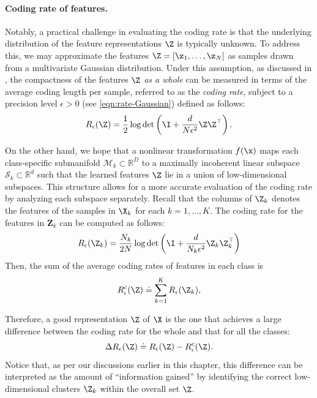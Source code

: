\documentclass[../../book-main.tex]{subfiles}
\begin{document}
\paragraph{Coding rate of features.} Notably, a practical challenge in evaluating the coding rate is that the underlying distribution of the feature representations $\Z$ is typically unknown. To address this, we may approximate the features $\Z = [\z_1, \ldots, \z_N]$ as samples drawn from a multivariate Gaussian distribution. Under this assumption, as discussed in , the compactness of the features $\Z$ {\em as a whole} can be measured in terms of the average coding length per sample, referred to as the {\em coding rate}, subject to a precision level $\epsilon > 0$ (see \eqref{eqn:rate-Gaussian}) defined as follows:
\begin{equation}
	R_{\epsilon}(\Z) = \frac{1}{2}\log\det\left(\I + \frac{d}{N\epsilon^{2}}\Z\Z^{\top}\right).
	\label{chap4-eqn:coding-length-eval}
\end{equation}

On the other hand, we hope that a nonlinear transformation $f(\x)$ maps each class-specific submanifold $\mathcal{M}_k \subset \mathbb{R}^D$ to a maximally incoherent linear subspace $\mathcal{S}_k \subset \mathbb{R}^d$ such that the learned features $\Z$ lie in a union of low-dimensional subspaces. This structure allows for a more accurate evaluation of the coding rate by analyzing each subspace separately. %
Recall that the columns of $\Z_k$ denotes the features of the samples in $\X_k$ for each $k=1,\dots,K$. The coding rate for the features in $\bm Z_k$ can be computed as follows: 
\begin{align}
    R_{\epsilon}(\Z_k) = \frac{N_k}{2N}\log\det\left(\I + \frac{d}{N_k\epsilon^{2}}\Z_k\Z_k^{\top}\right)
\end{align}
Then, the sum of the average coding rates of features in each class is 
\begin{equation}
	 R_{\epsilon}^c(\Z) \doteq \sum_{k=1}^K R_{\epsilon}(\Z_k),
	\label{chap4-eqn:compress-loss-eval}
\end{equation}

Therefore, a good representation $\Z$ of $\X$ is the one that achieves a large difference between the coding rate for the whole and that for all the classes:
\begin{equation}
	\Delta R_{\epsilon}(\Z) \doteq R_{\epsilon}(\Z) - R_{\epsilon}^c(\Z).
	\label{chap4-eqn:coding-length-reduction}
\end{equation}
Notice that, as per our discussions earlier in this chapter, this difference can be interpreted as the amount of ``information gained'' by identifying the correct low-dimensional clusters $\Z_k$ within the overall set $\Z$.
\end{document}
